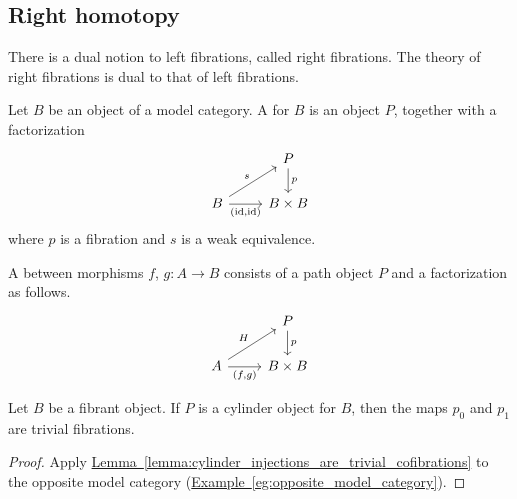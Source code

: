 \documentclass[main.tex]{subfiles}
\begin{document}
\subsection{Right homotopy}
\label{ssc:right_homotopy}

There is a dual notion to left fibrations, called right fibrations. The theory of right fibrations is dual to that of left fibrations.

\begin{definition}
  \label{def:path_object}
  Let $B$ be an object of a model category. A  for $B$ is an object $P$, together with a factorization
  \begin{equation*}
    \begin{tikzcd}
      & P
      \arrow[d, "p"]
      \\
      B
      \arrow[ur, "s"]
      \arrow[r, swap, "{(\id, \id)}"]
      & B \times B
    \end{tikzcd}
  \end{equation*}
  where $p$ is a fibration and $s$ is a weak equivalence.
\end{definition}

\begin{definition}
  \label{def:right_homotopy}
  A  between morphisms $f$, $g\colon A \to B$ consists of a path object $P$ and a factorization as follows.
  \begin{equation*}
    \begin{tikzcd}
      & P
      \arrow[d, "p"]
      \\
      A
      \arrow[ur, "H"]
      \arrow[r, swap, "{(f, g)}"]
      & B \times B
    \end{tikzcd}
  \end{equation*}
\end{definition}

\begin{lemma}
  \label{lemma:path_projections_are_trivial_fibrations}
  Let $B$ be a fibrant object. If $P$ is a cylinder object for $B$, then the maps $p_{0}$ and $p_{1}$ are trivial fibrations.
\end{lemma}
\begin{proof}
  Apply \hyperref[lemma:cylinder_injections_are_trivial_cofibrations]{Lemma~\ref*{lemma:cylinder_injections_are_trivial_cofibrations}} to the opposite model category (\hyperref[eg:opposite_model_category]{Example~\ref*{eg:opposite_model_category}}).
\end{proof}
\end{document}
